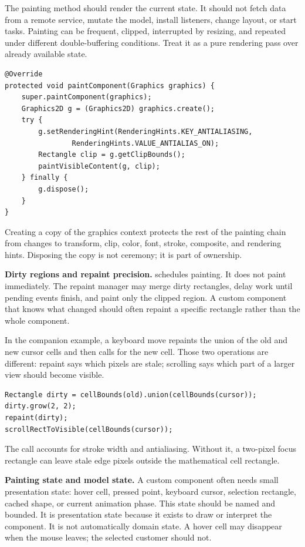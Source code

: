 The painting method should render the current state. It should not fetch data from a remote service, mutate the model, install listeners, change layout, or start tasks. Painting can be frequent, clipped, interrupted by resizing, and repeated under different double-buffering conditions. Treat it as a pure rendering pass over already available state.

\begin{lstlisting}[caption={The conservative painting skeleton.}]
@Override
protected void paintComponent(Graphics graphics) {
    super.paintComponent(graphics);
    Graphics2D g = (Graphics2D) graphics.create();
    try {
        g.setRenderingHint(RenderingHints.KEY_ANTIALIASING,
                RenderingHints.VALUE_ANTIALIAS_ON);
        Rectangle clip = g.getClipBounds();
        paintVisibleContent(g, clip);
    } finally {
        g.dispose();
    }
}
\end{lstlisting}

Creating a copy of the graphics context protects the rest of the painting chain from changes to transform, clip, color, font, stroke, composite, and rendering hints. Disposing the copy is not ceremony; it is part of ownership.

\textbf{Dirty regions and repaint precision.}  schedules painting. It does not paint immediately. The repaint manager may merge dirty rectangles, delay work until pending events finish, and paint only the clipped region. A custom component that knows what changed should often repaint a specific rectangle rather than the whole component.

In the companion example, a keyboard move repaints the union of the old and new cursor cells and then calls  for the new cell. Those two operations are different: repaint says which pixels are stale; scrolling says which part of a larger view should become visible.

\begin{lstlisting}[caption={Repainting the old and new cursor cells.}]
Rectangle dirty = cellBounds(old).union(cellBounds(cursor));
dirty.grow(2, 2);
repaint(dirty);
scrollRectToVisible(cellBounds(cursor));
\end{lstlisting}

The  call accounts for stroke width and antialiasing. Without it, a two-pixel focus rectangle can leave stale edge pixels outside the mathematical cell rectangle.

\textbf{Painting state and model state.} A custom component often needs small presentation state: hover cell, pressed
point, keyboard cursor, selection rectangle, cached shape, or current animation
phase. This state should be named and bounded. It is presentation state because
it exists to draw or interpret the component. It is not automatically domain
state. A hover cell may disappear when the mouse leaves; the selected customer
should not.


